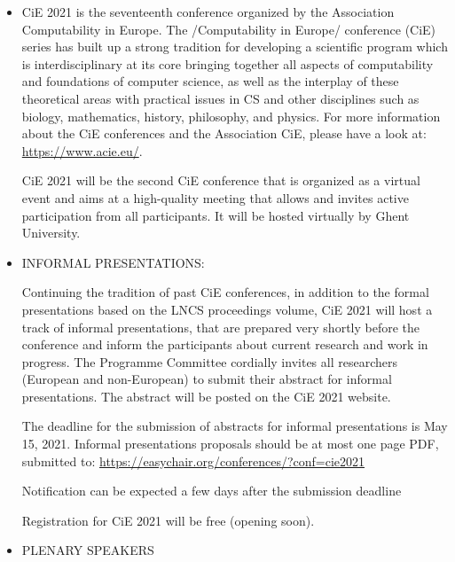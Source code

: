 \documentclass[prodmode,acmtecs]{acmsmall} %
\begin{document}
\begin{itemize}\item  CiE 2021 is the seventeenth conference organized by the Association Computability in Europe. The /Computability in Europe/ conference (CiE) series has built up a  strong tradition for developing a scientific program which is interdisciplinary at its core bringing together all aspects of computability and foundations of computer science, as well as the interplay of these theoretical areas with practical issues in CS and other disciplines such as biology, mathematics, history, philosophy, and physics. For more information about the CiE conferences and the Association  CiE, please have a look at: \href{https://www.acie.eu/}{https://www.acie.eu/}. 
 
  CiE 2021 will be the second CiE conference that is organized as a virtual event and aims at a high-quality meeting that allows and invites active participation from all participants. It will be hosted virtually by Ghent University. 
 
\item   INFORMAL PRESENTATIONS: 
 
  Continuing the tradition of past CiE conferences, in addition to the formal presentations based on the LNCS proceedings volume, CiE 2021 will host a track of informal presentations, that are prepared very shortly before the conference and inform the participants about current research and work in progress.  The Programme Committee cordially invites all researchers (European and non-European) to submit their abstract for informal presentations. The abstract will be posted on the CiE 2021 website. 
 
  The deadline for the submission of abstracts for informal presentations is May 15, 2021. Informal presentations proposals should be at most one page PDF, submitted to: \href{https://easychair.org/conferences/?conf=cie2021}{https://easychair.org/conferences/?conf=cie2021} 
 
  Notification can be expected a few days after the submission deadline 
 
  Registration for CiE 2021 will be free (opening soon). 
 
\item  PLENARY SPEAKERS 
 

\end{itemize}
\end{document}
